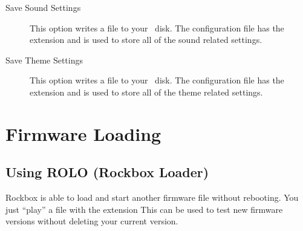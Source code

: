 \begin{description}
\item [Save Sound Settings]This option writes a  file to 
  your \daps\ disk.  The configuration file has the  
  extension and is used to store all of the sound related settings.
    
\item [Save Theme Settings]This option writes a  file to 
  your \daps\ disk.  The configuration file has the  
  extension and is used to store all of the theme related settings.

\end{description}

\section{\label{ref:FirmwareLoading}Firmware Loading}

\subsection{\label{ref:using_rolo}Using ROLO (Rockbox Loader)}
Rockbox is able to load and start another firmware file without rebooting. 
You just ``play'' a file with the extension %
This can be used to test new firmware versions without deleting your
current version.

